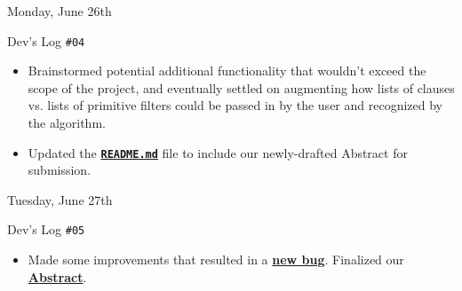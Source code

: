 \documentclass[11pt]{article}
\begin{document}
\normalsize\begin{leafgreenbox}{Monday, June 26th\vspace{-2.2em}\begin{flushright}Dev's Log \texttt{\#04}\hspace{0.5cm}\end{flushright}}
    \begin{itemize}         
        \item Brainstormed potential additional functionality that wouldn't exceed the scope of the project, and eventually settled on augmenting how lists of clauses vs. lists of primitive filters could be passed in by the user and recognized by the algorithm.
        \vspace{-0.25em}
        \item Updated the \href{https://github.com/usnistgov/ngpac/commit/594b40f05bf13d7824e076ca4f5457183e0db38d}{\textbf{\texttt{README.md}}} file to include our newly-drafted Abstract for submission.
    \end{itemize}
\end{leafgreenbox}

\begin{center}
    \vspace{-0.25em}
    \hspace{0.2cm}
    \vspace{-0.4em}
\end{center}

\normalsize\begin{leafgreenbox}{Tuesday, June 27th\vspace{-2.2em}\begin{flushright}Dev's Log \texttt{\#05}\hspace{0.5cm}\end{flushright}}
    \begin{itemize}         
        \item Made some improvements that resulted in a \href{https://github.com/usnistgov/ngpac/commit/70ece0fe6d537e2e63d131ab03440d1135f0557f}{\textbf{new bug}}. Finalized our \hyperlink{page.2}{\textbf{Abstract}}.
    \end{itemize}
\end{leafgreenbox}

\begin{center}
    \vspace{-0.25em}
    \hspace{0.2cm}
    \vspace{-0.4em}
\end{center}
\end{document}
